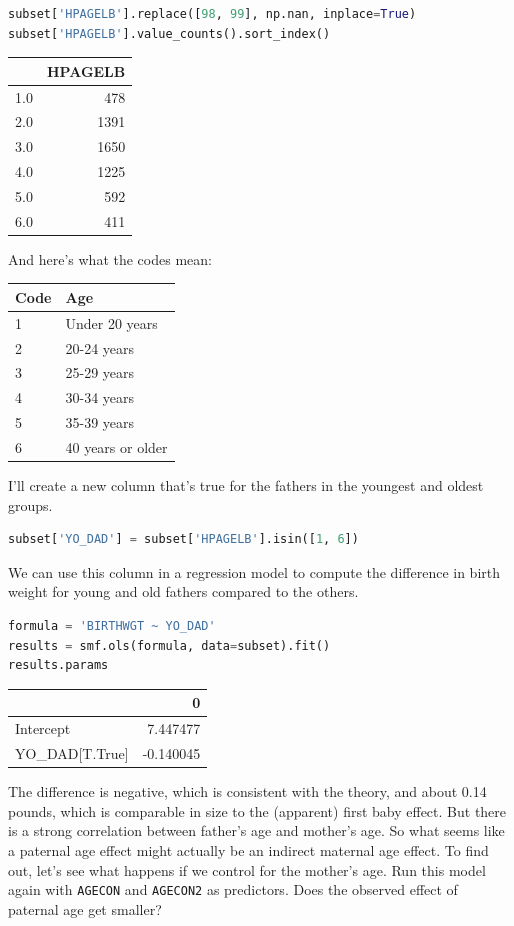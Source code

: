 \begin{lstlisting}[language=Python,style=source]
subset['HPAGELB'].replace([98, 99], np.nan, inplace=True)
subset['HPAGELB'].value_counts().sort_index()
\end{lstlisting}

\begin{tabular}{lr}
\toprule
{} &  HPAGELB \\
\midrule
1.0 &      478 \\
2.0 &     1391 \\
3.0 &     1650 \\
4.0 &     1225 \\
5.0 &      592 \\
6.0 &      411 \\
\bottomrule
\end{tabular}

And here's what the codes mean:

\begin{longtable}[]{@{}ll@{}}
\toprule
Code & Age\tabularnewline
\midrule
\endhead
1 & Under 20 years\tabularnewline
2 & 20-24 years\tabularnewline
3 & 25-29 years\tabularnewline
4 & 30-34 years\tabularnewline
5 & 35-39 years\tabularnewline
6 & 40 years or older\tabularnewline
\bottomrule
\end{longtable}

I'll create a new column that's true for the fathers in the youngest and
oldest groups.

\begin{lstlisting}[language=Python,style=source]
subset['YO_DAD'] = subset['HPAGELB'].isin([1, 6])
\end{lstlisting}

We can use this column in a regression model to compute the difference
in birth weight for young and old fathers compared to the others.

\begin{lstlisting}[language=Python,style=source]
formula = 'BIRTHWGT ~ YO_DAD'
results = smf.ols(formula, data=subset).fit()
results.params
\end{lstlisting}

\begin{tabular}{lr}
\toprule
{} &         0 \\
\midrule
Intercept      &  7.447477 \\
YO\_DAD[T.True] & -0.140045 \\
\bottomrule
\end{tabular}

The difference is negative, which is consistent with the theory, and
about 0.14 pounds, which is comparable in size to the (apparent) first
baby effect. But there is a strong correlation between father's age and
mother's age. So what seems like a paternal age effect might actually be
an indirect maternal age effect. To find out, let's see what happens if
we control for the mother's age. Run this model again with
\passthrough{\lstinline!AGECON!} and \passthrough{\lstinline!AGECON2!}
as predictors. Does the observed effect of paternal age get smaller?

